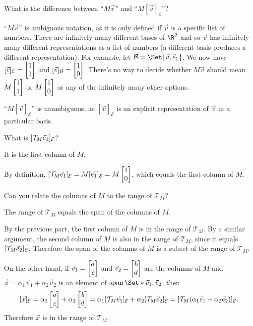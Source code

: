 	\begin{parts}
		\item What is the difference between
			``$M\vec v$'' and ``$M[\vec v]_{\mathcal E}$''?
			\begin{solution}
				``$M\vec v$'' is ambiguous notation, as it is only defined if
				$\vec v$ is a specific list of numbers. There are infinitely many
				different bases of $\R^2$ and so $\vec v$ has
				infinitely many different representations as a list of numbers
				(a different basis produces a different representation). For example,
				let $\mathcal B=\Set{\vec v, \xhat}$. We now have
				$[\vec v]_{\mathcal E}=\mat{1\\1}$ and $[\vec v]_{\mathcal B}=\mat{1\\0}$.
				There's no way to decide whether $M\vec v$ should mean $M\mat{1\\1}$ or $M\mat{1\\0}$
				or any of the infinitely many other options.

				``$M[\vec v]_{\mathcal E}$'' is unambiguous, as
				$[\vec v]_{\mathcal E}$ is an explicit representation of $\vec v$
				in a particular basis.
			\end{solution}
		\item What is $[\mathcal T_M{\vec e_1}]_{\mathcal E}$?
			\begin{solution}
				It is the first column of $M$.

				By definition,
				$[\mathcal T_M\xhat]_{\mathcal E}=M[\xhat]_{\mathcal E}=M\mat{1\\0}$,
				which equals the first column of $M$.
			\end{solution}
		\item \label{inducedTransform.3}
			Can you relate the columns of $M$ to the range of $\mathcal T_M$?
			\begin{solution}
				The range of $\mathcal T_M$ equals the span of the columns of $M$.

				By the previous part, the first column of $M$ is in the range of
				$\mathcal T_M$. By a similar argument, the second column of $M$ is also
				in the range of $\mathcal T_M$, since it equals $[\mathcal T_M{\vec e_2}]_{\mathcal E}$.
				Therefore the span of the columns of $M$ is a subset of the range
				of $\mathcal T_M$.

				On the other hand, if $\vec v_1=\mat{a\\c}$ and $\vec v_2=\mat{b\\d}$
				are the columns of $M$ and $\vec x = \alpha_1\vec v_1+\alpha_2\vec v_2$
				is an element of $\Span\Set*{\vec v_1,\vec v_2}$, then
				\[
					[\vec x]_{\mathcal E}
					=\alpha_1\mat{a\\c}+\alpha_2\mat{b\\d}
					=\alpha_1[\mathcal T_M\xhat]_{\mathcal E}+\alpha_2[\mathcal T_M\yhat]_{\mathcal E}
					=[\mathcal T_M(\alpha_1\xhat+\alpha_2\yhat)]_{\mathcal E}.
				\]
				Therefore $\vec x$ is in the range of $\mathcal T_M$.
			\end{solution}
	\end{parts}


